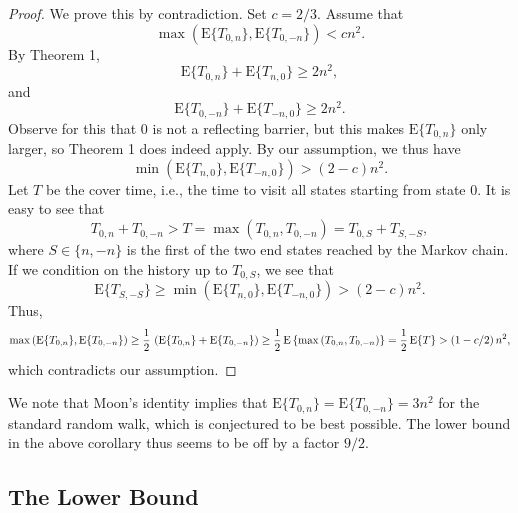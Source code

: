 \documentclass [letterpaper] {patmorin}
\newcommand{\EXP}{\mathrm{E}}
\begin{document}
\begin{proof}
We prove this by contradiction. Set $c = 2/3$. Assume that
\[
\max \left( \EXP \{ T_{0,n} \} , \EXP \{ T_{0,-n} \} \right) <  cn^2.
\]
By Theorem 1,
\[
 \EXP \{ T_{0,n} \}  +  \EXP \{ T_{n,0} \}  \ge 2n^2,
\]
and
\[
 \EXP \{ T_{0,-n} \}  +  \EXP \{ T_{-n,0} \}  \ge 2n^2.
\]
Observe for this that $0$ is not a reflecting barrier, but this makes 
$ \EXP \{ T_{0,n} \}$ only larger, so Theorem 1 does indeed apply.
By our assumption, we thus have
\[
\min \left( \EXP \{ T_{n,0} \} ,  \EXP \{ T_{-n,0} \} \right) >  (2-c) n^2.
\]
Let $T$ be the cover time, i.e., the time to visit all states starting from state $0$. It is easy to see that
\[
T_{0,n} + T_{0,-n} > T = \max \left( T_{0,n} , T_{0,-n} \right)
  =  T_{0,S} + T_{S,-S},
\]
where $S \in \{ n, -n \}$ is the first of the two end states
reached by the Markov chain. If we condition on the history up to $T_{0,S}$,
we see that
\[
\EXP \{ T_{S,-S} \} \ge \min \left( \EXP \{ T_{n,0} \} ,  \EXP \{ T_{-n,0} \} \right) >  (2-c) n^2.
\]
Thus,
\[
\max \left( \EXP \{ T_{0,n} \} , \EXP \{ T_{0,-n} \} \right)
 \ge {1 \over 2} \, \left( \EXP \{ T_{0,n} \} + \EXP \{ T_{0,-n} \} \right)
 \ge {1 \over 2} \, \EXP \left\{ \max \left( T_{0,n} , T_{0,-n} \right) \right\} 
= {1 \over 2} \, \EXP \{ T \}
>  (1- c/2 ) \,  n^2 ,
\]
which contradicts our assumption.
\end{proof}

We note that Moon's identity \cite{X} implies that $\EXP \{ T_{0,n} \} = \EXP \{ T_{0,-n} \} = 3n^2$
for the standard random walk, which is conjectured to be best possible.
The lower bound in the above corollary thus seems to be off by a factor $9/2$.

\subsection{The Lower Bound}
\label{sec:bound}
\end{document}
